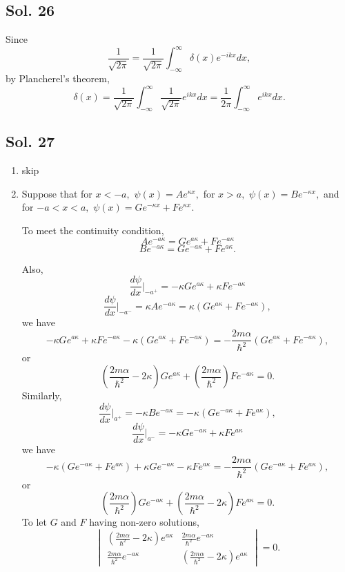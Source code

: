 \subsection*{Sol. 26}

Since 
$$
\frac{1}{\sqrt{2\pi}} = \frac{1}{\sqrt{2\pi}}
\int_{-\infty}^{\infty}
\delta(x)e^{-ikx}dx,
$$
by Plancherel's theorem,
$$
\delta(x) = \frac{1}{\sqrt{2\pi}}
\int_{-\infty}^{\infty}
\frac{1}{\sqrt{2\pi}}e^{ikx}dx
=\frac{1}{2\pi}\int_{-\infty}^{\infty}
e^{ikx}dx.
$$

\subsection*{Sol. 27}
\begin{enumerate}
    \item skip
    \item 
    Suppose that for $x<-a,$ $\psi(x)=Ae^{\kappa x},$
    for $x>a,$ $\psi(x)=Be^{-\kappa x},$
    and for $-a<x<a,$ $\psi(x)=Ge^{-\kappa x} + Fe^{\kappa x}.$

    To meet the continuity condition, 
    $$
    Ae^{-a\kappa} = Ge^{a\kappa } + Fe^{-a\kappa}
    $$
    $$
    Be^{-a\kappa} = Ge^{-a\kappa } + Fe^{a\kappa}.
    $$

    Also,
    $$
    \frac{d\psi}{dx}\bigg|_{-a^+}=-\kappa G 
    e^{a\kappa}+
    \kappa Fe^{-a\kappa }
    $$
    $$
    \frac{d\psi}{dx}\bigg|_{-a^-}=\kappa Ae^{-a\kappa}=
    \kappa (Ge^{a\kappa } + Fe^{-a\kappa}),
    $$
    we have
    $$
    -\kappa G e^{a\kappa}+\kappa Fe^{-a\kappa }
    -
    \kappa (Ge^{a\kappa } + Fe^{-a\kappa})
    =-\frac{2m\alpha}{\hbar^2}
    (Ge^{a\kappa } + Fe^{-a\kappa}),
    $$
    or 
     $$
    (\frac{2m\alpha}{\hbar^2}-2\kappa)G e^{a\kappa}
    +
    (\frac{2m\alpha}{\hbar^2})Fe^{-a\kappa }=0.
    $$
    Similarly,
     $$
    \frac{d\psi}{dx}\bigg|_{a^+}=-\kappa Be^{-a\kappa}
    =-\kappa (Ge^{-a\kappa } + Fe^{a\kappa}),
    $$
    $$
    \frac{d\psi}{dx}\bigg|_{a^-}=-\kappa G e^{-a\kappa}+\kappa Fe^{a\kappa }
    $$
    we have
    $$
    -\kappa (Ge^{-a\kappa } + Fe^{a\kappa})+\kappa G e^{-a\kappa}-\kappa Fe^{a\kappa }
    =-\frac{2m\alpha}{\hbar^2}(Ge^{-a\kappa } + Fe^{a\kappa}),
    $$
    or 
    $$
    (\frac{2m\alpha}{\hbar^2})Ge^{-a\kappa} +
    (\frac{2m\alpha}{\hbar^2}-2\kappa)F e^{a\kappa} = 0.
    $$
    To let $G$ and $F$ having non-zero solutions,
    $$
    \begin{vmatrix}
    (\frac{2m\alpha}{\hbar^2}-2\kappa)e^{a\kappa}
     & \frac{2m\alpha}{\hbar^2}e^{-a\kappa}\\
     \frac{2m\alpha}{\hbar^2}e^{-a\kappa} & 
     (\frac{2m\alpha}{\hbar^2}-2\kappa)e^{a\kappa}
    \end{vmatrix} = 0.
    $$
    

\end{enumerate}
